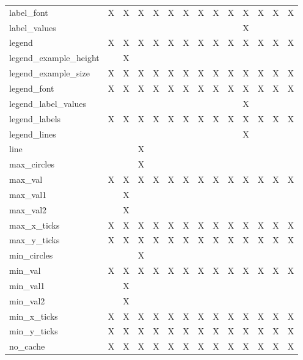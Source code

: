 {\begin{table}
\begin{tabular}{|l|c|c|c|c|c|c|c|c|c|c|c|c|c|}
label\_font            & X & X & X & X & X & X & X & X & X & X & X & X & X \\
label\_values          &   &   &   &   &   &   &   &   &   & X &   &   &   \\
legend                 & X & X & X & X & X & X & X & X & X & X & X & X & X \\
legend\_example\_height&   & X &   &   &   &   &   &   &   &   &   &   &   \\
legend\_example\_size  & X & X & X & X & X & X & X & X & X & X & X & X & X \\
legend\_font           & X & X & X & X & X & X & X & X & X & X & X & X & X \\
legend\_label\_values  &   &   &   &   &   &   &   &   &   & X &   &   &   \\
legend\_labels         & X & X & X & X & X & X & X & X & X & X & X & X & X \\
legend\_lines          &   &   &   &   &   &   &   &   &   & X &   &   &   \\
line                   &   &   & X &   &   &   &   &   &   &   &   &   &   \\
max\_circles           &   &   & X &   &   &   &   &   &   &   &   &   &   \\
max\_val               & X & X & X & X & X & X & X & X & X & X & X & X & X \\
max\_val1              &   & X &   &   &   &   &   &   &   &   &   &   &   \\
max\_val2              &   & X &   &   &   &   &   &   &   &   &   &   &   \\
max\_x\_ticks          & X & X & X & X & X & X & X & X & X & X & X & X & X \\
max\_y\_ticks          & X & X & X & X & X & X & X & X & X & X & X & X & X \\
min\_circles           &   &   & X &   &   &   &   &   &   &   &   &   &   \\
min\_val               & X & X & X & X & X & X & X & X & X & X & X & X & X \\
min\_val1              &   & X &   &   &   &   &   &   &   &   &   &   &   \\
min\_val2              &   & X &   &   &   &   &   &   &   &   &   &   &   \\
min\_x\_ticks          & X & X & X & X & X & X & X & X & X & X & X & X & X \\
min\_y\_ticks          & X & X & X & X & X & X & X & X & X & X & X & X & X \\
no\_cache              & X & X & X & X & X & X & X & X & X & X & X & X & X \\

\end{tabular}
\end{table}}
